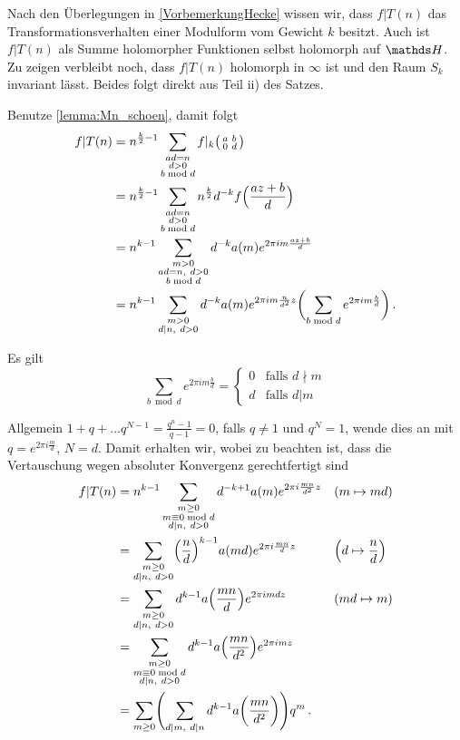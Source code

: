 \begin{bewe-list}
\item Nach den Überlegungen in \autoref{VorbemerkungHecke} wissen wir, dass $f | T(n)$ das Transformationsverhalten einer Modulform vom Gewicht $k$ besitzt. Auch ist $f | T(n)$ als Summe holomorpher Funktionen selbst holomorph auf $\HH$. Zu zeigen verbleibt noch, dass $f | T(n)$ holomorph in $\infty$ ist und den Raum $S_k$ invariant lässt. Beides folgt direkt aus Teil ii) des Satzes.

\item Benutze \autoref{lemma:Mn_schoen}, damit folgt
\begin{align*}
f|T(n)
&= n^{\frac{k}{2}-1} \sum_{\substack{ad=n\\ d>0 \\ b\bmod d}} f|_k \mymat ab0d \\
&= n^{\frac{k}{2}-1} \sum_{\substack{ad=n\\ d>0 \\ b\bmod d}} n^{\frac{k}{2}} d^{-k} f\Bigl(\frac{az+b}{d}\Bigr) \\
&= n^{k-1} \sum_{\substack{m>0\\ ad=n,\ d>0\\ b\bmod d}} d^{-k} a(m) e^{2\pi im \frac{az+b}{d}} \\
&= n^{k-1} \sum_{\substack{m>0\\ d|n,\ d>0}} d^{-k} a(m) e^{2\pi im \frac{n}{d^2}z} \biggl( \sum_{b\bmod d} e^{2\pi im \frac{b}{d}}\biggr)
\,.
\end{align*}

Es gilt
\[
\sum_{b \bmod d} e^{2\pi im \frac{b}{d}}
= \begin{cases}
0 & \text{falls } d\nmid m \\
d & \text{falls } d| m
\end{cases}
\]

Allgemein $1+q+\ldots q^{N-1} = \frac{q^n-1}{q-1} = 0$, falls $q\not=1$ und $q^N = 1$, wende dies an mit $q=e^{2\pi i \frac{m}{d}}$, $N=d$.
Damit erhalten wir, wobei zu beachten ist, dass die Vertauschung wegen absoluter Konvergenz gerechtfertigt sind
\begin{align*}
f|T(n)
&= n^{k-1} \sum_{\substack{m \geq 0 \\ m \equiv 0 \bmod d \\ d|n,\ d > 0}} d^{-k+1} a(m) e^{2\pi i\frac{mn}{d^2}z} &&(m\mapsto md) \\
&= \sum_{\substack{m \geq 0\\ d|n,\ d>0}} \Bigl(\frac{n}{d}\Bigr)^{k-1} a(md) e^{2\pi i \frac{mn}{d}z} &&\Bigl(d\mapsto\frac{n}{d}\Bigr) \\
&= \sum_{\substack{m \geq 0 \\ d|n,\ d>0}} d^{k-1} a\Bigl(\frac{mn}{d}\Bigr) e^{2\pi imdz} && (md\mapsto m) \\
&= \sum_{\substack{m\geq 0 \\ m\equiv 0 \bmod d \\ d|n,\ d>0}} d^{k-1} a\Bigl(\frac{mn}{d^2}\Bigr) e^{2\pi imz} \\
&= \sum_{m\geq 0} \Biggl(\sum_{d|m,\ d|n} d^{k-1} a\biggl(\frac{mn}{d^2}\biggr)\Biggr) q^m
\,.
\end{align*}
\end{bewe-list}

